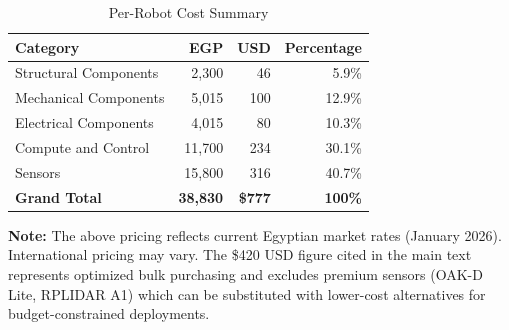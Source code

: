 \begin{table}[H]
\centering
\caption{Per-Robot Cost Summary}
\label{tab:bom_summary_appendix}
\begin{tabular}{|l|r|r|r|}
\hline
\textbf{Category} & \textbf{EGP} & \textbf{USD} & \textbf{Percentage} \\
\hline
Structural Components & 2,300 & 46 & 5.9\% \\
Mechanical Components & 5,015 & 100 & 12.9\% \\
Electrical Components & 4,015 & 80 & 10.3\% \\
Compute and Control & 11,700 & 234 & 30.1\% \\
Sensors & 15,800 & 316 & 40.7\% \\
\hline
\textbf{Grand Total} & \textbf{38,830} & \textbf{\$777} & \textbf{100\%} \\
\hline
\end{tabular}
\end{table}

\textbf{Note:} The above pricing reflects current Egyptian market rates (January 2026). International pricing may vary. The \$420 USD figure cited in the main text represents optimized bulk purchasing and excludes premium sensors (OAK-D Lite, RPLIDAR A1) which can be substituted with lower-cost alternatives for budget-constrained deployments.
